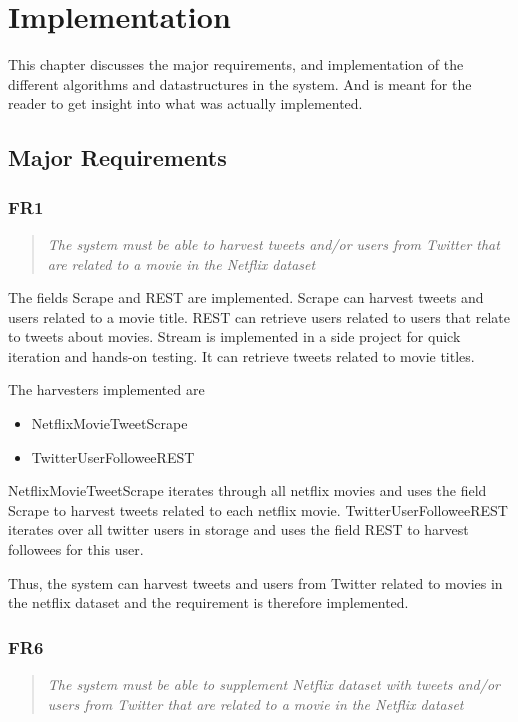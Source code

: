 
\chapter{Implementation}

\minitoc

This chapter discusses the major requirements, and implementation of the different algorithms and datastructures in the system. And is meant for the reader to get insight into what was actually implemented.

\clearpage

\section{Major Requirements}\label{impl:Major Requirements}
\subsection{FR1}
\begin{quotation}
\em The system must be able to harvest tweets and/or users from Twitter that are related to a movie in the Netflix dataset %
\end{quotation}

The fields Scrape and REST are implemented. Scrape can harvest tweets and users related to a movie title. REST can retrieve users related to users that relate to tweets about movies. Stream is implemented in a side project for quick iteration and hands-on testing. It can retrieve tweets related to movie titles.

The harvesters implemented are
\begin{itemize}
\item NetflixMovieTweetScrape
\item TwitterUserFolloweeREST
\end{itemize}

NetflixMovieTweetScrape iterates through all netflix movies and uses the field Scrape to harvest tweets related to each netflix movie. TwitterUserFolloweeREST iterates over all twitter users in storage and uses the field REST to harvest followees for this user.

Thus, the system can harvest tweets and users from Twitter related to movies in the netflix dataset and the requirement is therefore implemented.

\subsection{FR6}\label{subsec:FR6}
\begin{quotation}
\em The system must be able to supplement Netflix dataset with tweets and/or users from Twitter that are related to a movie in the Netflix dataset %
\end{quotation}

